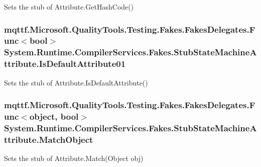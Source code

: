 Sets the stub of Attribute.\-Get\-Hash\-Code()

\hypertarget{class_system_1_1_runtime_1_1_compiler_services_1_1_fakes_1_1_stub_state_machine_attribute_a0a38fb4d83c7d2dc2594e5a796c53008}{
\subsubsection[{Is\-Default\-Attribute01}]{\setlength{\rightskip}{0pt plus 5cm}mqttf.\-Microsoft.\-Quality\-Tools.\-Testing.\-Fakes.\-Fakes\-Delegates.\-Func$<$bool$>$ System.\-Runtime.\-Compiler\-Services.\-Fakes.\-Stub\-State\-Machine\-Attribute.\-Is\-Default\-Attribute01}}\label{class_system_1_1_runtime_1_1_compiler_services_1_1_fakes_1_1_stub_state_machine_attribute_a0a38fb4d83c7d2dc2594e5a796c53008}


Sets the stub of Attribute.\-Is\-Default\-Attribute()

\hypertarget{class_system_1_1_runtime_1_1_compiler_services_1_1_fakes_1_1_stub_state_machine_attribute_a0c3fb13bedd30dfb2a9a9f054c87f6bd}{
\subsubsection[{Match\-Object}]{\setlength{\rightskip}{0pt plus 5cm}mqttf.\-Microsoft.\-Quality\-Tools.\-Testing.\-Fakes.\-Fakes\-Delegates.\-Func$<$object, bool$>$ System.\-Runtime.\-Compiler\-Services.\-Fakes.\-Stub\-State\-Machine\-Attribute.\-Match\-Object}}\label{class_system_1_1_runtime_1_1_compiler_services_1_1_fakes_1_1_stub_state_machine_attribute_a0c3fb13bedd30dfb2a9a9f054c87f6bd}


Sets the stub of Attribute.\-Match(\-Object obj)

